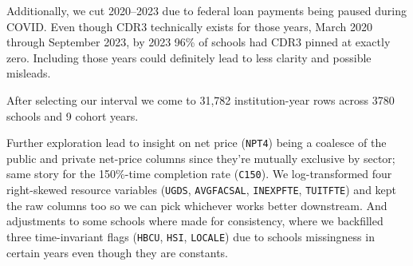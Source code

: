 \documentclass[
]{article}
\begin{document}
Additionally, we cut 2020--2023 due to federal loan payments being
paused during COVID. Even though CDR3 technically exists for those
years, March 2020 through September 2023, by 2023 96\% of schools had
CDR3 pinned at exactly zero. Including those years could definitely lead
to less clarity and possible misleads.

After selecting our interval we come to 31,782 institution-year rows
across 3780 schools and 9 cohort years.

Further exploration lead to insight on net price (\texttt{NPT4}) being a
coalesce of the public and private net-price columns since they're
mutually exclusive by sector; same story for the 150\%-time completion
rate (\texttt{C150}). We log-transformed four right-skewed resource
variables (\texttt{UGDS}, \texttt{AVGFACSAL}, \texttt{INEXPFTE},
\texttt{TUITFTE}) and kept the raw columns too so we can pick whichever
works better downstream. And adjustments to some schools where made for
consistency, where we backfilled three time-invariant flags
(\texttt{HBCU}, \texttt{HSI}, \texttt{LOCALE}) due to schools
missingness in certain years even though they are constants.

\begingroup\fontsize{9}{11}\selectfont
\end{document}
